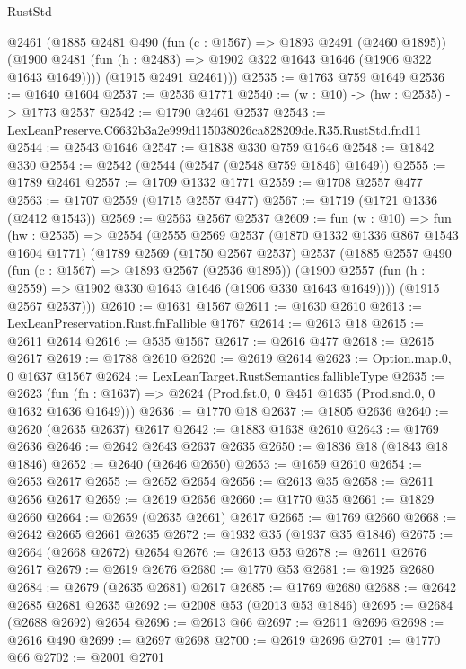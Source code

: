 \begin{lexlean}{RustStd}
\begin{coremodule}
        @2461
        (@1885
          @2481
          @490
          (fun (c : @1567) => @1893 @2491 (@2460 @1895))
          (@1900 @2481 (fun (h : @2483) => @1902 @322 @1643 @1646 (@1906 @322 @1643 @1649))))
        (@1915 @2491 @2461)))
@2535 := @1763 @759 @1649
@2536 := @1640 @1604
@2537 := @2536 @1771
@2540 := (w : @10) -> (hw : @2535) -> @1773 @2537
@2542 := @1790 @2461 @2537
@2543 := LexLeanPreserve.C6632b3a2e999d115038026ca828209de.R35.RustStd.fnd11
@2544 := @2543 @1646
@2547 := @1838 @330 @759 @1646
@2548 := @1842 @330
@2554 := @2542 (@2544 (@2547 (@2548 @759 @1846) @1649))
@2555 := @1789 @2461
@2557 := @1709 @1332 @1771
@2559 := @1708 @2557 @477
@2563 := @1707 @2559 (@1715 @2557 @477)
@2567 := @1719 (@1721 @1336 (@2412 @1543))
@2569 := @2563 @2567 @2537
@2609 := fun (w : @10) =>
  fun (hw : @2535) =>
  @2554
    (@2555
      @2569
      @2537
      (@1870 @1332 @1336 @867 @1543 @1604 @1771)
      (@1789
        @2569
        (@1750 @2567 @2537)
        @2537
        (@1885
          @2557
          @490
          (fun (c : @1567) => @1893 @2567 (@2536 @1895))
          (@1900 @2557 (fun (h : @2559) => @1902 @330 @1643 @1646 (@1906 @330 @1643 @1649))))
        (@1915 @2567 @2537)))
@2610 := @1631 @1567
@2611 := @1630 @2610
@2613 := LexLeanPreservation.Rust.fnFallible @1767
@2614 := @2613 @18
@2615 := @2611 @2614
@2616 := @535 @1567
@2617 := @2616 @477
@2618 := @2615 @2617
@2619 := @1788 @2610
@2620 := @2619 @2614
@2623 := Option.map.{0, 0} @1637 @1567
@2624 := LexLeanTarget.RustSemantics.fallibleType
@2635 := @2623
    (fun (fn : @1637) => @2624 (Prod.fst.{0, 0} @451 @1635 (Prod.snd.{0, 0} @1632 @1636 @1649)))
@2636 := @1770 @18
@2637 := @1805 @2636
@2640 := @2620 (@2635 @2637) @2617
@2642 := @1883 @1638 @2610
@2643 := @1769 @2636
@2646 := @2642 @2643 @2637 @2635
@2650 := @1836 @18 (@1843 @18 @1846)
@2652 := @2640 (@2646 @2650)
@2653 := @1659 @2610
@2654 := @2653 @2617
@2655 := @2652 @2654
@2656 := @2613 @35
@2658 := @2611 @2656 @2617
@2659 := @2619 @2656
@2660 := @1770 @35
@2661 := @1829 @2660
@2664 := @2659 (@2635 @2661) @2617
@2665 := @1769 @2660
@2668 := @2642 @2665 @2661 @2635
@2672 := @1932 @35 (@1937 @35 @1846)
@2675 := @2664 (@2668 @2672) @2654
@2676 := @2613 @53
@2678 := @2611 @2676 @2617
@2679 := @2619 @2676
@2680 := @1770 @53
@2681 := @1925 @2680
@2684 := @2679 (@2635 @2681) @2617
@2685 := @1769 @2680
@2688 := @2642 @2685 @2681 @2635
@2692 := @2008 @53 (@2013 @53 @1846)
@2695 := @2684 (@2688 @2692) @2654
@2696 := @2613 @66
@2697 := @2611 @2696
@2698 := @2616 @490
@2699 := @2697 @2698
@2700 := @2619 @2696
@2701 := @1770 @66
@2702 := @2001 @2701

\end{coremodule}
\end{lexlean}

